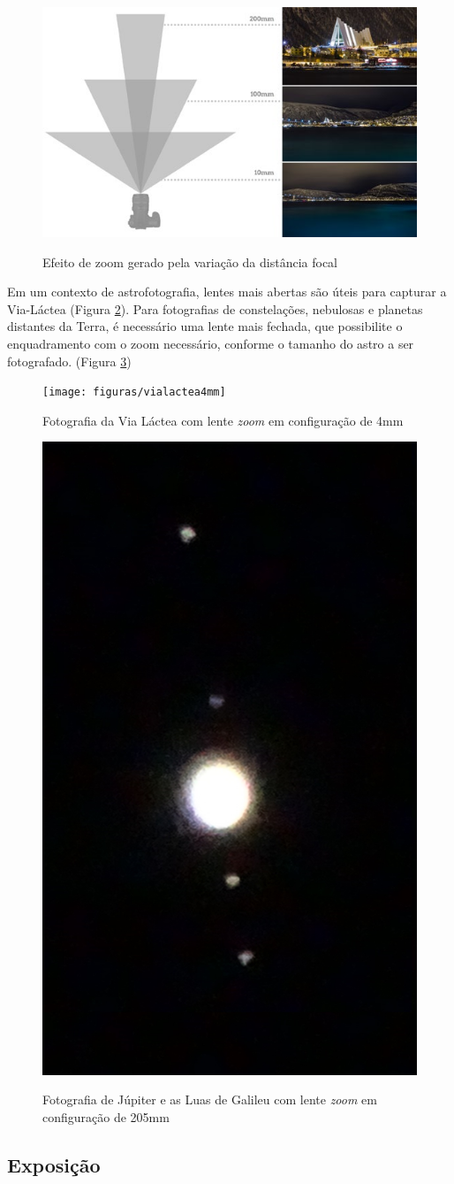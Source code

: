 \begin{figure}[htb]
	\centering
	\caption{Efeito de zoom gerado pela variação da distância focal}
	\includegraphics[width=0.7\linewidth]{figuras/claudia-distanciafocal}
	\label{fig:focaldistance}
\end{figure}

Em um contexto de astrofotografia, lentes mais abertas são úteis para capturar a Via-Láctea (Figura \ref{fig:vialactea4mmSony}). Para fotografias de constelações, nebulosas e planetas distantes da Terra, é necessário uma lente mais fechada, que possibilite o enquadramento com o zoom necessário, conforme o tamanho do astro a ser fotografado. (Figura \ref{fig:jupiterSony})

\begin{figure}[!htb]
	\centering
	\caption{Fotografia da Via Láctea com lente \textit{zoom} em configuração de 4mm}
	\texttt{[image: figuras/vialactea4mm]}
	\label{fig:vialactea4mmSony}
\end{figure}

\begin{figure}[!htb]
	\centering
	\caption{Fotografia de Júpiter e as Luas de Galileu com lente \textit{zoom} em configuração de 205mm}
	\includegraphics[width=0.2\linewidth]{figuras/jupiter205mm_Luas}
	\label{fig:jupiterSony}
\end{figure}

\subsection{Exposição}

